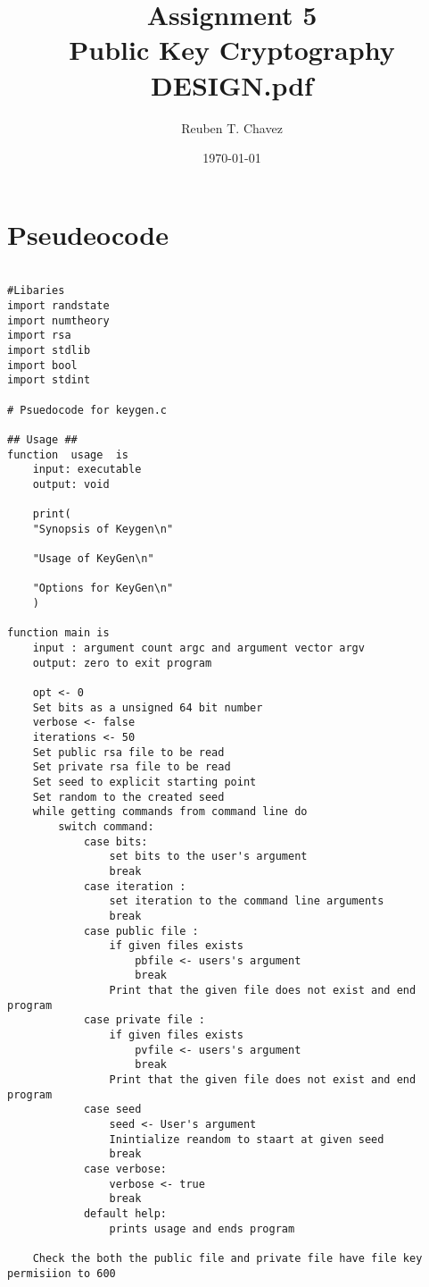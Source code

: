 \documentclass[11pt]{article} %
\title{Assignment 5 \\
    \large Public Key Cryptography \\
    \textbf{DESIGN.pdf}}
\author{Reuben T. Chavez}
\date{\today} %
\begin{document}
\maketitle %

\pagebreak
\section*{Pseudeocode}
\begin{flushleft}
\begin{lstlisting}

#Libaries
import randstate
import numtheory
import rsa
import stdlib
import bool
import stdint

# Psuedocode for keygen.c

## Usage ##
function  usage  is
    input: executable
    output: void

    print(
    "Synopsis of Keygen\n"

    "Usage of KeyGen\n"

    "Options for KeyGen\n"
    )

function main is
    input : argument count argc and argument vector argv
    output: zero to exit program
    
    opt <- 0
    Set bits as a unsigned 64 bit number
    verbose <- false
    iterations <- 50
    Set public rsa file to be read
    Set private rsa file to be read
    Set seed to explicit starting point
    Set random to the created seed
    while getting commands from command line do
        switch command:
            case bits:
                set bits to the user's argument
                break
            case iteration :
                set iteration to the command line arguments
                break
            case public file :
                if given files exists
                    pbfile <- users's argument
                    break
                Print that the given file does not exist and end program
            case private file :
                if given files exists
                    pvfile <- users's argument
                    break
                Print that the given file does not exist and end program
            case seed
                seed <- User's argument
                Inintialize reandom to staart at given seed
                break
            case verbose:
                verbose <- true
                break
            default help:
                prints usage and ends program

    Check the both the public file and private file have file key permisiion to 600


\end{lstlisting}
\end{flushleft}
\end{document}
